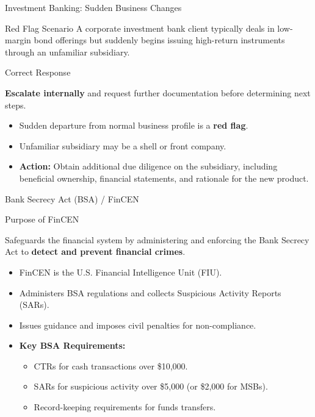 \documentclass{beamer}
\begin{document}
	\begin{frame}{Investment Banking: Sudden Business Changes}
		\begin{block}{Red Flag Scenario}
			A corporate investment bank client typically deals in low-margin bond offerings but suddenly begins issuing high-return instruments through an unfamiliar subsidiary.
		\end{block}
		\begin{block}{Correct Response}
			\begin{center}
				\textbf{Escalate internally} and request further documentation before determining next steps.
			\end{center}
		\end{block}
		\begin{itemize}
			\item Sudden departure from normal business profile is a \textbf{red flag}.
			\item Unfamiliar subsidiary may be a shell or front company.
			\item \textbf{Action:} Obtain additional due diligence on the subsidiary, including beneficial ownership, financial statements, and rationale for the new product.
		\end{itemize}
	\end{frame}
	
	\begin{frame}{Bank Secrecy Act (BSA) / FinCEN}
		\begin{block}{Purpose of FinCEN}
			\begin{center}
				Safeguards the financial system by administering and enforcing the Bank Secrecy Act to \textbf{detect and prevent financial crimes}.
			\end{center}
		\end{block}
		\begin{itemize}
			\item FinCEN is the U.S. Financial Intelligence Unit (FIU).
			\item Administers BSA regulations and collects Suspicious Activity Reports (SARs).
			\item Issues guidance and imposes civil penalties for non-compliance.
			\item \textbf{Key BSA Requirements:}
			\begin{itemize}
				\item CTRs for cash transactions over \$10,000.
				\item SARs for suspicious activity over \$5,000 (or \$2,000 for MSBs).
				\item Record-keeping requirements for funds transfers.
			\end{itemize}
		\end{itemize}
	\end{frame}
	
\end{document}
